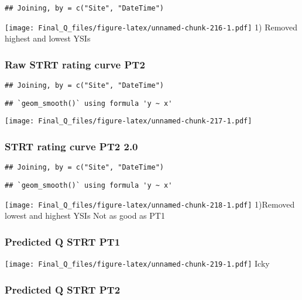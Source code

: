 \documentclass[
]{article}
\begin{document}
\begin{verbatim}
## Joining, by = c("Site", "DateTime")
\end{verbatim}

\texttt{[image: Final\_Q\_files/figure-latex/unnamed-chunk-216-1.pdf]} 1)
Removed highest and lowest YSIs

\hypertarget{raw-strt-rating-curve-pt2}{%
\subsubsection{Raw STRT rating curve
PT2}\label{raw-strt-rating-curve-pt2}}

\begin{verbatim}
## Joining, by = c("Site", "DateTime")
\end{verbatim}

\begin{verbatim}
## `geom_smooth()` using formula 'y ~ x'
\end{verbatim}

\texttt{[image: Final\_Q\_files/figure-latex/unnamed-chunk-217-1.pdf]}

\hypertarget{strt-rating-curve-pt2-2.0}{%
\subsubsection{STRT rating curve PT2
2.0}\label{strt-rating-curve-pt2-2.0}}

\begin{verbatim}
## Joining, by = c("Site", "DateTime")
\end{verbatim}

\begin{verbatim}
## `geom_smooth()` using formula 'y ~ x'
\end{verbatim}

\texttt{[image: Final\_Q\_files/figure-latex/unnamed-chunk-218-1.pdf]}
1)Removed lowest and highest YSIs Not as good as PT1

\hypertarget{predicted-q-strt-pt1-1}{%
\subsubsection{Predicted Q STRT PT1}\label{predicted-q-strt-pt1-1}}

\texttt{[image: Final\_Q\_files/figure-latex/unnamed-chunk-219-1.pdf]}
Icky

\hypertarget{predicted-q-strt-pt2-1}{%
\subsubsection{Predicted Q STRT PT2}\label{predicted-q-strt-pt2-1}}
\end{document}
